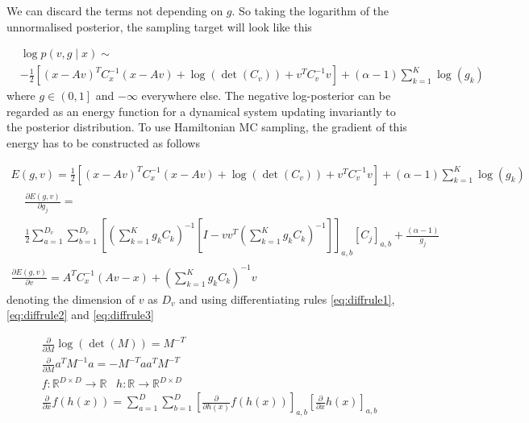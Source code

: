 \documentclass{paper}
\begin{document}
%
We can discard the terms not depending on $g$. So taking the logarithm of the unnormalised posterior, the sampling target will look like this

\begin{equation}
\begin{split}
&\log p(v,g \mid x) \sim \\ 
&-\frac{1}{2} \left[(x-Av)^T C_x^{-1} (x-Av) + \log(\det(C_v)) + v^T C_v^{-1} v\right] + (\alpha-1) \sum_{k=1}^K \log(g_k) \label{eq:log_post}
\end{split}
\end{equation}
%
where $g \in \left(0,1 \right]$ and $-\infty$ everywhere else. The negative log-posterior can be regarded as an energy function for a dynamical system updating invariantly to the posterior distribution. To use Hamiltonian MC sampling, the gradient of this energy has to be constructed as follows

\begin{eqnarray}
E(g,v) = \frac{1}{2} \left[(x-Av)^T C_x^{-1} (x-Av) + \log(\det(C_v)) + v^T C_v^{-1} v\right] + (\alpha-1) \sum_{k=1}^K \log(g_k)\\
\begin{split}
&\frac{\partial E(g,v)}{\partial g_j} = \\
&\frac{1}{2} \sum_{a=1}^{D_v} \sum_{b=1}^{D_v} \left[ \left( \sum_{k=1}^K g_k C_k \right)^{-1} \left[ I - vv^T \left( \sum_{k=1}^K g_k C_k \right)^{-1} \right] \right]_{a,b} \left[ C_j \right]_{a,b} + \frac{(\alpha-1)}{g_j}
\end{split}\\
\frac{\partial E(g,v)}{\partial v} = A^T C_x^{-1}(Av-x) + \left( \sum_{k=1}^K g_k C_k \right)^{-1} v
\end{eqnarray}
%
denoting the dimension of $v$ as $D_v$ and using differentiating rules \ref{eq:diffrule1}, \ref{eq:diffrule2} and \ref{eq:diffrule3}

\begin{eqnarray}
\frac{\partial}{\partial M} \log(\det(M))= M^{-T} \label{eq:diffrule1}\\
\frac{\partial}{\partial M} a^T M^{-1} a = - M^{-T} aa^T M^{-T} \label{eq:diffrule2}\\
f: \mathbb{R}^{D \times D} \rightarrow \mathbb{R} \;\;\; h: \mathbb{R} \rightarrow \mathbb{R}^{D \times D} \nonumber\\
\frac{\partial}{\partial x} f(h(x)) = \sum_{a=1}^D \sum_{b=1}^D \left[ \frac{\partial}{\partial h(x)} f(h(x)) \right]_{a,b} \left[ \frac{\partial}{\partial x} h(x) \right]_{a,b} \label{eq:diffrule3}
\end{eqnarray}
\end{document}

